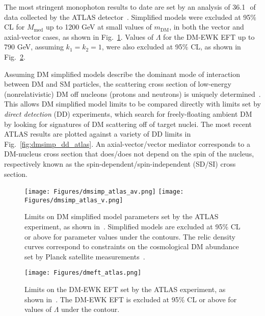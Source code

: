 The most stringent monophoton results to date are set by an analysis of 36.1\,\fbinv\ of data collected by the ATLAS detector~\cite{ref:epjc/s10052-017-4965-8}.
Simplified models were excluded at 95\% CL for $M_\mathrm{med}$ up to 1200 GeV at small values of $m_\mathrm{DM}$, in both the vector and axial-vector cases, as shown in Fig.~\ref{fig:dmsimp_atlas}.
Values of $\Lambda$ for the DM-EWK EFT up to 790 GeV, assuming $k_{1} = k_{2} = 1$, were also excluded at 95\% CL, as shown in Fig.~\ref{fig:dmeft_atlas}.

Assuming DM simplified models describe the dominant mode of interaction between DM and SM particles, the scattering cross section of low-energy (nonrelativistic) DM off nucleons (protons and neutrons)
is uniquely determined~\cite{ref:1603.04156}. This allows DM simplified model limits to be compared directly with limits set by \textit{direct detection} (DD) experiments, which search for freely-floating
ambient DM by looking for signatures of DM scattering off of target nuclei.
The most recent ATLAS results are plotted against a variety of DD limits in Fig.~\ref{fig:dmsimp_dd_atlas}. An axial-vector/vector mediator corresponds to a DM-nucleus cross section
that does/does not depend on the spin of the nucleus, respectively known as the spin-dependent/spin-independent (SD/SI) cross section.

\begin{figure}[hbtb]
  \begin{center}
    \texttt{[image: Figures/dmsimp\_atlas\_av.png]}
    \texttt{[image: Figures/dmsimp\_atlas\_v.png]}
    \caption{Limits on DM simplified model parameters set by the ATLAS experiment, as shown in~\cite{ref:epjc/s10052-017-4965-8}. Simplified models are excluded at 95\% CL or above
    for parameter values under the contours. The relic density curves correspond to constraints on the cosmological DM abundance set by Planck satellite measurements~\cite{ref:planck2018_cosparams}.
    }
    \label{fig:dmsimp_atlas}
  \end{center}
\end{figure}

\begin{figure}[hbtb]
  \begin{center}
    \texttt{[image: Figures/dmeft\_atlas.png]}
    \caption{Limits on the DM-EWK EFT set by the ATLAS experiment, as shown in~\cite{ref:epjc/s10052-017-4965-8}. The DM-EWK EFT is excluded at 95\% CL or above for
    values of $\Lambda$ under the contour.
    }
    \label{fig:dmeft_atlas}
  \end{center}
\end{figure}

